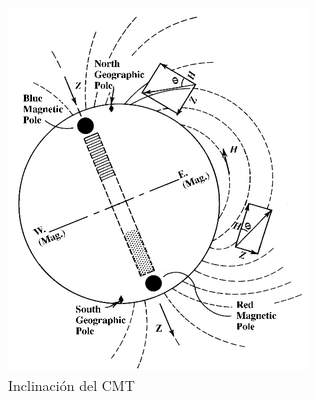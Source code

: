 \begin{frame}
\begin{columns}
\begin{column}{0.3\textwidth}
\begin{center}
    \includegraphics[width=\textwidth]{05.instrumentos.giroscopicos.imagenes/05.04.MagnetismoTerrestre/05-04-desviacion_polos.png}\\
    Inclinaci\'on del CMT
  \end{center}
\end{column}
\end{columns}

\end{frame}

